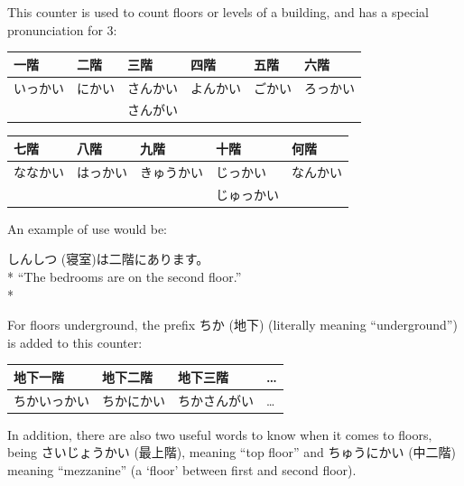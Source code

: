 \documentclass[11pt, b5paper, twoside, openright, onecolumn]{book}
\makeatletter
\newcommand*{\rubystack}[2]{{\relscale{0.5}%
  \begin{tabular}[b]{@{}c@{}}%
    {#1}\\%
   {\textscale{2}{#2}}%
  \end{tabular}}%
}
\DeclareRobustCommand*{\ruby}[2]{%
  \mbox{%
    \setlength{\parskip}{0ex}%
    \BeginAccSupp{method=pdfstringdef,ActualText={#1}}%
      \rubystack{\phantom{#2}}{#1}%
      \llap{%
        \rubystack{#2}{\phantom{#1}}%
      }%
    \EndAccSupp{}%
  }%
}
\renewcommand*{\ruby}[2]{#2 (#1)}%
\newenvironment{exampleblock}{
\setlength{\parindent}{0.6in}
\begin{minipage}[t]{\dimexpr\textwidth-\parindent}}
{\end{minipage}}
\newenvironment{mytabular}[1]{\noindent\hspace{0.4in}
\begin{tabular}[h]{#1}}{\end{tabular}}
\makeatother
\begin{document}
This counter is used to count floors or levels of a building‚ and has a special pronunciation for 3:

\vspace{0.5cm}
\smaller
\begin{mytabular}{| l  l  l  l  l  l |}\hline 
\rule{0pt}{2.4ex}一階 & 二階 & 三階 & 四階 & 五階 & 六階\\ 
\hline
\rule{0pt}{2.4ex}いっかい & にかい & さんかい & よんかい & ごかい & ろっかい\\ 
\rule{0pt}{2.4ex} &  & さんがい &  &  & \\ 
\hline 
\end{mytabular}
\larger
\vspace{0.5cm}

\smaller
\begin{mytabular}{| l  l  l  l  l |}\hline 
\rule{0pt}{2.4ex}七階 & 八階 & 九階 & 十階 & 何階\\ 
\hline
\rule{0pt}{2.4ex}ななかい & はっかい & きゅうかい & じっかい & なんかい\\ 
\rule{0pt}{2.4ex} &  &  & じゅっかい & \\ 
\hline 
\end{mytabular}
\larger
\vspace{0.5cm}


An example of use would be:

\vspace{0.4cm}
\begin{exampleblock}
\ruby{寝室}{しんしつ}は二階にあります。 \\* 
“The bedrooms are on the second floor.” \\* 
\end{exampleblock}
\vspace{0.2cm}

For floors underground‚ the prefix \ruby{地下}{ちか} (literally meaning “underground”) is added to this counter:

\vspace{0.5cm}
\smaller
\begin{mytabular}{| l  l  l  l |}\hline 
\rule{0pt}{2.4ex}地下一階 & 地下二階 & 地下三階 & …\\ 
\hline
\rule{0pt}{2.4ex}ちかいっかい & ちかにかい & ちかさんがい & …\\ 
\hline 
\end{mytabular}
\larger
\vspace{0.5cm}


In addition‚ there are also two useful words to know when it comes to floors‚ being \ruby{最上階}{さいじょうかい}‚ meaning “top floor” and \ruby{中二階}{ちゅうにかい} meaning “mezzanine” (a ‘floor’ between first and second floor).
\end{document}
